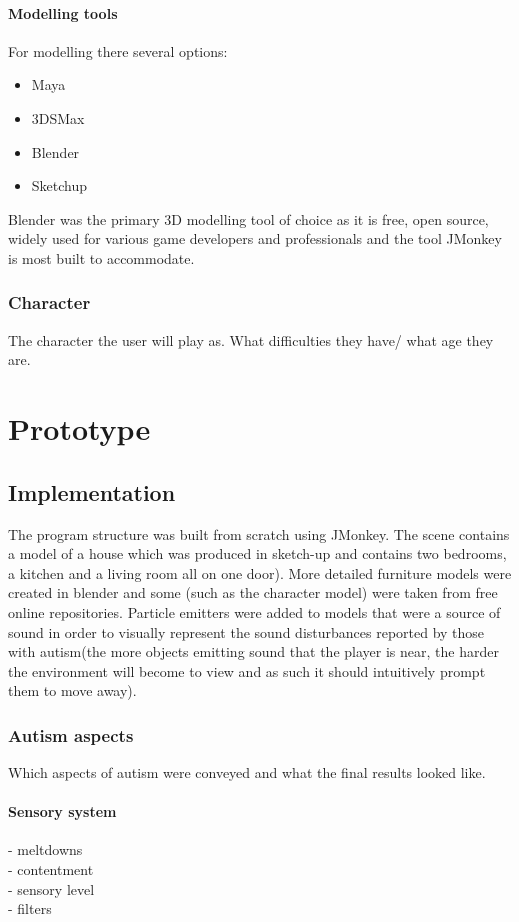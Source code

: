\documentclass[11pt]{report}
\begin{document}
\subsubsection{Modelling tools}
For modelling there several options:
\begin{itemize}
\item Maya
\item 3DSMax
\item Blender
\item Sketchup
\end{itemize}

Blender was the primary 3D modelling tool of choice as it is free, open source, widely used for various game developers and professionals and the tool JMonkey is most built to accommodate.


\subsection{Character}
The character the user will play as. What difficulties they have/ what age they are.


\chapter{Prototype}

\section{Implementation}
The program structure was built from scratch using JMonkey. The scene contains a model of a house which was produced in sketch-up and contains two bedrooms, a kitchen and a living room all on one door). More detailed furniture models were created in blender and some (such as the character model) were taken from free online repositories. Particle emitters were added to models that were a source of sound in order to visually represent the sound disturbances reported by those with autism(the more objects emitting sound that the player is near, the harder the environment will become to view and as such it should intuitively prompt them to move away).

\subsection{Autism aspects}
Which aspects of autism were conveyed and what the final results looked like.

\subsubsection{Sensory system}
- meltdowns\\
- contentment\\
- sensory level\\
- filters\\
\end{document}
